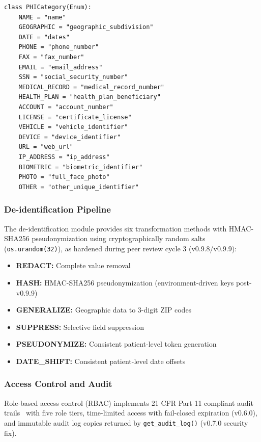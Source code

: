 \begin{lstlisting}[caption={PHI detection categories from \texttt{privacy/phi-pii-management/phi\_detector.py} (v0.6.0)}]
class PHICategory(Enum):
    NAME = "name"
    GEOGRAPHIC = "geographic_subdivision"
    DATE = "dates"
    PHONE = "phone_number"
    FAX = "fax_number"
    EMAIL = "email_address"
    SSN = "social_security_number"
    MEDICAL_RECORD = "medical_record_number"
    HEALTH_PLAN = "health_plan_beneficiary"
    ACCOUNT = "account_number"
    LICENSE = "certificate_license"
    VEHICLE = "vehicle_identifier"
    DEVICE = "device_identifier"
    URL = "web_url"
    IP_ADDRESS = "ip_address"
    BIOMETRIC = "biometric_identifier"
    PHOTO = "full_face_photo"
    OTHER = "other_unique_identifier"
\end{lstlisting}

\subsubsection{De-identification Pipeline}

The de-identification module provides six transformation methods with HMAC-SHA256 pseudonymization using cryptographically random salts (\texttt{os.urandom(32)}), as hardened during peer review cycle 3 (v0.9.8/v0.9.9):

\begin{itemize}
  \item \textbf{REDACT:} Complete value removal
  \item \textbf{HASH:} HMAC-SHA256 pseudonymization (environment-driven keys post-v0.9.9)
  \item \textbf{GENERALIZE:} Geographic data to 3-digit ZIP codes
  \item \textbf{SUPPRESS:} Selective field suppression
  \item \textbf{PSEUDONYMIZE:} Consistent patient-level token generation
  \item \textbf{DATE\_SHIFT:} Consistent patient-level date offsets
\end{itemize}

\subsubsection{Access Control and Audit}

Role-based access control (RBAC) implements 21 CFR Part 11 compliant audit trails~\cite{cfr_part11} with five role tiers, time-limited access with fail-closed expiration (v0.6.0), and immutable audit log copies returned by \texttt{get\_audit\_log()} (v0.7.0 security fix).

